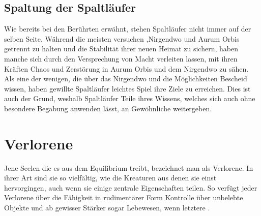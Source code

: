 \documentclass[a4paper,12pt,oneside]{book}
\begin{document}
\subsection{Spaltung der Spaltläufer}
Wie bereits bei den Berührten erwähnt, stehen Spaltläufer nicht immer auf der selben Seite. Während die meisten versuchen ,Nirgendwo und Aurum Orbis getrennt zu halten und die Stabilität ihrer neuen Heimat zu sichern, haben manche sich durch den Versprechung von Macht verleiten lassen, mit ihren Kräften Chaos und Zerstörung in Aurum Orbis und dem Nirgendwo zu sähen. Als eine der wenigen, die über das Nirgendwo und die Möglichkeiten Bescheid wissen, haben gewillte Spaltläufer leichtes Spiel ihre Ziele zu erreichen. Dies ist auch der Grund, weshalb Spaltläufer Teile ihres Wissens, welches sich auch ohne besondere Begabung anwenden lässt, an Gewöhnliche weitergeben.

\section{Verlorene}
Jene Seelen die es aus dem Equilibrium treibt, bezeichnet man als Verlorene. In ihrer Art sind sie so vielfältig, wie die Kreaturen aus denen sie einst hervorgingen, auch wenn sie einige zentrale Eigenschaften teilen. So verfügt jeder Verlorene über die Fähigkeit in rudimentärer Form Kontrolle über unbelebte Objekte und ab gewisser Stärker sogar Lebewesen, wenn letztere .
\end{document}
